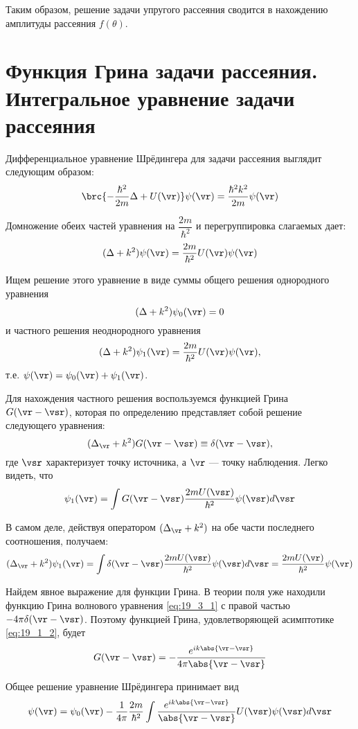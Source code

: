 Таким образом, решение задачи упругого рассеяния сводится в нахождению амплитуды рассеяния $f(\theta)$.

\section{Функция Грина задачи рассеяния. Интегральное уравнение задачи рассеяния}

Дифференциальное уравнение Шрёдингера для задачи рассеяния выглядит следующим образом:
$$
\brc{-\frac{\hbar^2}{2m} \Delta + U(\vr)}\psi(\vr) = \frac{\hbar^2 k^2}{2m} \psi(\vr)
$$

Домножение обеих частей уравнения на $\dfrac{2m}{\hbar^2}$ и перегруппировка слагаемых дает:
$$
(\Delta + k^2) \psi(\vr) = \frac{2m}{\hbar^2}U(\vr)\psi(\vr)
$$

Ищем решение этого уравнение в виде суммы общего решения однородного уравнения
$$
(\Delta + k^2) \psi_0(\vr) = 0
$$
и частного решения неоднородного уравнения
$$
(\Delta + k^2) \psi_1(\vr) = \frac{2m}{\hbar^2}U(\vr)\psi(\vr),
$$
т.е. $\psi(\vr)=\psi_0(\vr) + \psi_1(\vr)$.

Для нахождения частного решения воспользуемся функцией Грина $G(\vr - \vsr)$, которая по определению представляет собой решение следующего уравнения:
\begin{equation}
\label{eq:19_3_1}
(\Delta_{\vr} + k^2)G(\vr - \vsr) \equiv \delta(\vr - \vsr),
\end{equation}
где $\vsr$ характеризует точку источника, а $\vr$ --- точку наблюдения. Легко видеть, что
$$
\psi_1(\vr) = \int G(\vr - \vsr) \frac{2m U(\vsr)}{\hbar^2} \psi(\vsr) d\vsr
$$

В самом деле, действуя оператором $(\Delta_{\vr} + k^2)$ на обе части последнего соотношения, получаем:
$$
(\Delta_{\vr} + k^2) \psi_1(\vr) = \int \delta(\vr - \vsr) \frac{2m U(\vsr)}{\hbar^2} \psi(\vsr) d\vsr = \frac{2m U(\vr)}{\hbar^2} \psi(\vr)
$$

Найдем явное выражение для функции Грина. В теории поля уже находили функцию Грина волнового уравнения \eqref{eq:19_3_1} с правой частью $-4\pi \delta(\vr - \vsr)$. Поэтому функцией Грина, удовлетворяющей асимптотике \eqref{eq:19_1_2}, будет
$$
G(\vr - \vsr) = - \frac{e^{ik\abs{\vr - \vsr}}}{4\pi\abs{\vr - \vsr}}
$$

Общее решение уравнение Шрёдингера принимает вид
$$
\psi(\vr) = \psi_0(\vr) - \frac{1}{4 \pi}\frac{2m}{\hbar^2}\int \frac{e^{ik\abs{\vr - \vsr}}}{\abs{\vr - \vsr}} U(\vsr)\psi(\vsr)d\vsr
$$


